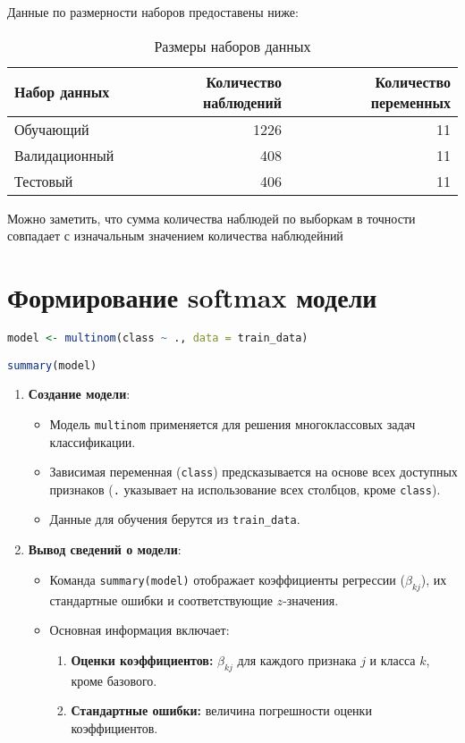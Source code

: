Данные по размерности наборов предоставены ниже:
\begin{table}[h]
	\centering
	\caption{Размеры наборов данных}
	\begin{tabular}{@{}lrr@{}}
		\toprule
		Набор данных     & Количество наблюдений & Количество переменных \\ \midrule
		Обучающий        & 1226                  & 11                    \\
		Валидационный    & 408                   & 11                    \\
		Тестовый         & 406                   & 11                    \\ \bottomrule
	\end{tabular}
\end{table}

Можно заметить, что сумма количества наблюдей по выборкам в точности совпадает с изначальным значением количества наблюдейний

\section{Формирование softmax модели}

\begin{lstlisting}[language=R, caption={Формирование модели для классификации квартир}]
model <- multinom(class ~ ., data = train_data)

summary(model)
\end{lstlisting}

\begin{enumerate}
	\item \textbf{Создание модели}:
	\begin{itemize}
		\item Модель \texttt{multinom} применяется для решения многоклассовых задач классификации.
		\item Зависимая переменная (\texttt{class}) предсказывается на основе всех доступных признаков (\texttt{.} указывает на использование всех столбцов, кроме \texttt{class}).
		\item Данные для обучения берутся из \texttt{train\_data}.
	\end{itemize}
	
	\item \textbf{Вывод сведений о модели}:
	\begin{itemize}
		\item Команда \texttt{summary(model)} отображает коэффициенты регрессии (\( \beta_{kj} \)), их стандартные ошибки и соответствующие \( z \)-значения.
		\item Основная информация включает:
		\begin{enumerate}
			\item \textbf{Оценки коэффициентов:} \( \beta_{kj} \) для каждого признака \( j \) и класса \( k \), кроме базового.
			\item \textbf{Стандартные ошибки:} величина погрешности оценки коэффициентов.
	\end{enumerate}
	\end{itemize}
\end{enumerate}

